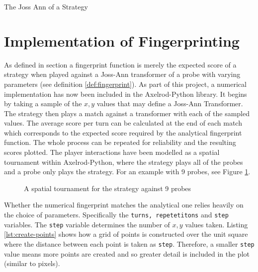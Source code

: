 \begin{algorithm}[H]
 \caption{The Joss Ann of a Strategy}
 \label{alg:joss-ann}
\end{algorithm}

\section{Implementation of Fingerprinting}\label{sec:fingerprint-implementation}

As defined in section a fingerprint function is merely the expected score of a strategy when played against a Joss-Ann transformer of a probe with varying parameters (see definition \ref{def:fingerprint}).
As part of this project, a numerical implementation has now been included in the Axelrod-Python library.
It begins by taking a sample of the $x,y$ values that may define a Joss-Ann Transformer.
The strategy then plays a match against a transformer with each of the sampled values.
The average score per turn can be calculated at the end of each match which corresponds to the expected score required by the analytical fingerprint function.
The whole process can be repeated for reliability and the resulting scores plotted.
The player interactions have been modelled as a spatial tournament within Axelrod-Python, where the strategy plays all of the probes and a probe only plays the strategy.
For an example with 9 probes, see Figure \ref{fig:spatialtourn}.

\begin{figure}[!hbtp]
    \begin{center}
        
        \caption{A spatial tournament for the strategy against 9 probes}\label{fig:spatialtourn}
    \end{center}
\end{figure}


Whether the numerical fingerprint matches the analytical one relies heavily on the choice of parameters.
Specifically the \texttt{turns, repetetitons} and \texttt{step} variables.
The \texttt{step} variable determines the number of $x,y$ values taken.
Listing \ref{lst:create-points} shows how a grid of points is constructed over the unit square where the distance between each point is taken as \texttt{step}.
Therefore, a smaller \texttt{step} value means more points are created and so greater detail is included in the plot (similar to pixels).

